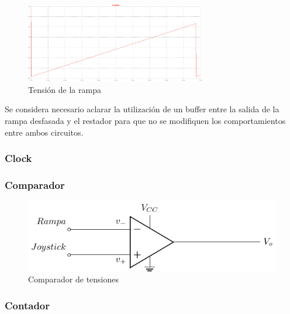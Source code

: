 \begin{figure}[H]
\centering
\includegraphics[width=0.7\textwidth]{Ejercicio8/Imagenes/Rampa}
\caption{Tensión de la rampa}
\label{fig:Generador_de_rampa_LTSpice}
\end{figure}



Se considera necesario aclarar la utilización de un buffer entre la salida de la rampa desfasada y el restador para que no se modifiquen los comportamientos entre ambos circuitos.\par

\subsubsection{Clock}


\subsubsection{Comparador}

\begin{figure}[H]
\centering
\includegraphics[scale=0.8]{Ejercicio8/Circuitos/Comparador.pdf}
\caption{Comparador de tensiones}
\label{fig:Comparador}
\end{figure}

\subsubsection{Contador}

